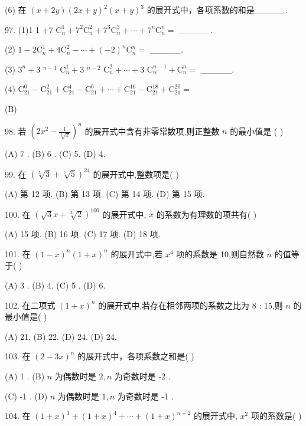 \documentclass[10pt]{article}
\begin{document}
(6) 在 \(\left( {x + {2y}}\right) {\left( 2x + y\right) }^{2}{\left( x + y\right) }^{3}\) 的展开式中，各项系数的和是\_\_\_\_\_.

97. (1)1 1 +7 \({\mathrm{C}}_{n}^{1} + {7}^{2}{\mathrm{C}}_{n}^{2} + {7}^{3}{\mathrm{C}}_{n}^{3} + \cdots  + {7}^{n}{\mathrm{C}}_{n}^{n} =\) \_\_\_\_\_.

(2) \(1 - 2{\mathrm{C}}_{n}^{1} + 4{\mathrm{C}}_{n}^{2} - \cdots  + {\left( -2\right) }^{n}{\mathrm{C}}_{n}^{n} =\) \_\_\_\_\_.

(3) \({3}^{n} + 3\)  \({}^{n - 1}\)  \({\mathrm{C}}_{n}^{1} + 3\)  \({}^{n - 2}\)  \({\mathrm{C}}_{n}^{2} + \cdots  + 3\)  \({\mathrm{C}}_{n}^{n - 1} + {\mathrm{C}}_{n}^{n} =\) \_\_\_\_\_.

(4) \({\mathrm{C}}_{21}^{0} - {\mathrm{C}}_{21}^{2} + {\mathrm{C}}_{21}^{4} - {\mathrm{C}}_{21}^{6} + \cdots  + {\mathrm{C}}_{21}^{16} - {\mathrm{C}}_{21}^{18} + {\mathrm{C}}_{21}^{20} =\)

(B)

98. 若 \({\left( 2{x}^{2} - \frac{1}{\sqrt[3]{x}}\right) }^{n}\) 的展开式中含有非零常数项,则正整数 \(n\) 的最小值是 ( )

(A) 7 . (B) 6 . (C) 5. (D) 4.

99. 在 \({\left( \sqrt[5]{3} + \sqrt[7]{5}\right) }^{24}\) 的展开式中,整数项是( )

(A) 第 12 项. (B) 第 13 项. (C) 第 14 项. (D) 第 15 项.

100. 在 \({\left( \sqrt{3}x + \sqrt[3]{2}\right) }^{100}\) 的展开式中, \(x\) 的系数为有理数的项共有( )

(A) 15 项. (B) 16 项. (C) 17 项. (D) 18 项.

101. 在 \({\left( 1 - x\right) }^{n}{\left( 1 + x\right) }^{n}\) 的展开式中,若 \({x}^{4}\) 项的系数是 10,则自然数 \(n\) 的值等于( )

(A) 3 . (B) 4. (C) 5 . (D) 6.

102. 在二项式 \({\left( 1 + x\right) }^{n}\) 的展开式中,若存在相邻两项的系数之比为 8 : 15,则 \(n\) 的最小值是( )

(A) 21. (B) 22. (D) 24. (D) 24.

103. 在 \({\left( 2 - 3x\right) }^{n}\) 的展开式中，各项系数之和是( )

(A) 1 . (B) \(n\) 为偶数时是 \(2,n\) 为奇数时是 -2 .

(C) -1 . (D) \(n\) 为偶数时是 \(1,n\) 为奇数时是 -1 .

104. 在 \({\left( 1 + x\right) }^{3} + {\left( 1 + x\right) }^{4} + \cdots  + {\left( 1 + x\right) }^{n + 2}\) 的展开式中, \({x}^{2}\) 项的系数是( )
\end{document}

